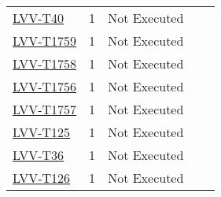 \documentclass[DM,lsstdraft,STR,toc]{lsstdoc}
\begin{document}
{\begin{longtable}{p{2cm}cp{2.3cm}p{8.6cm}p{2.3cm}}
\begin{minipage}[]{9cm}
\medskip
\end{minipage}
&
\\\hline
\href{https://jira.lsstcorp.org/secure/Tests.jspa#/testCase/LVV-T40}{LVV-T40}
&  1
& Not Executed &
\begin{minipage}[]{9cm}
\smallskip

\medskip
\end{minipage}
&
\\\hline
\href{https://jira.lsstcorp.org/secure/Tests.jspa#/testCase/LVV-T1759}{LVV-T1759}
&  1
& Not Executed &
\begin{minipage}[]{9cm}
\smallskip

\medskip
\end{minipage}
&
\\\hline
\href{https://jira.lsstcorp.org/secure/Tests.jspa#/testCase/LVV-T1758}{LVV-T1758}
&  1
& Not Executed &
\begin{minipage}[]{9cm}
\smallskip

\medskip
\end{minipage}
&
\\\hline
\href{https://jira.lsstcorp.org/secure/Tests.jspa#/testCase/LVV-T1756}{LVV-T1756}
&  1
& Not Executed &
\begin{minipage}[]{9cm}
\smallskip

\medskip
\end{minipage}
&
\\\hline
\href{https://jira.lsstcorp.org/secure/Tests.jspa#/testCase/LVV-T1757}{LVV-T1757}
&  1
& Not Executed &
\begin{minipage}[]{9cm}
\smallskip

\medskip
\end{minipage}
&
\\\hline
\href{https://jira.lsstcorp.org/secure/Tests.jspa#/testCase/LVV-T125}{LVV-T125}
&  1
& Not Executed &
\begin{minipage}[]{9cm}
\smallskip

\medskip
\end{minipage}
&
\\\hline
\href{https://jira.lsstcorp.org/secure/Tests.jspa#/testCase/LVV-T36}{LVV-T36}
&  1
& Not Executed &
\begin{minipage}[]{9cm}
\smallskip

\medskip
\end{minipage}
&
\\\hline
\href{https://jira.lsstcorp.org/secure/Tests.jspa#/testCase/LVV-T126}{LVV-T126}
&  1
& Not Executed &
\begin{minipage}[]{9cm}
\smallskip


\end{minipage}
\end{longtable}}
\end{document}
